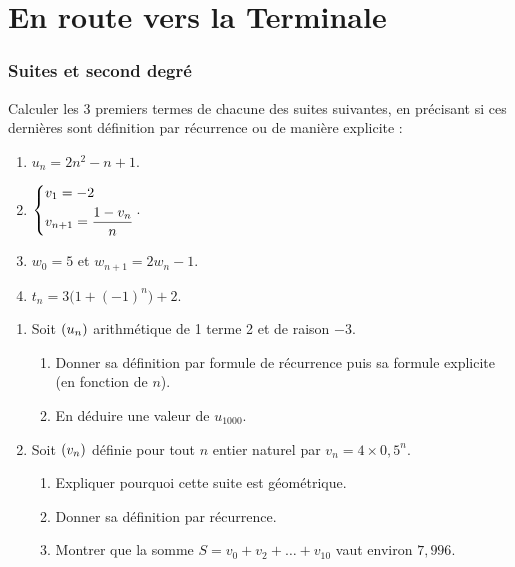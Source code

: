 \documentclass[a4paper,11pt]{article}
\author{Pierquet}
\title{\nomfichier}
\begin{document}

\pagestyle{fancy}

\part*{En route vers la Terminale}

\smallskip


\smallskip

\section{Suites et second degré}

\begin{cexercice}
Calculer les 3 premiers termes de chacune des suites suivantes, en précisant si ces dernières sont définition par récurrence ou de manière explicite :
%
\begin{enumerate}
	\item $u_n = 2n^2-n+1$.
	\item $\begin{dcases} v_1=-2 \\ v_{n+1}=\dfrac{1-v_n}{n} \end{dcases}$.
	\item $w_0=5$ et $w_{n+1}=2w_n-1$.
	\item $t_n=3\big(1+(-1)^n\big)+2$.
\end{enumerate}
\end{cexercice}

\begin{cexercice}
\vspace{-0.8\baselineskip}
\begin{enumerate}[leftmargin=*]
	\item Soit $\suiten$ arithmétique de 1 terme 2 et de raison $-3$.
	\begin{enumerate}
		\item Donner sa définition par formule de récurrence puis sa formule explicite (en fonction de $n$).
		\item En déduire une valeur de $u_{\num{1000}}$.
	\end{enumerate}
	\item Soit $\suiten[v]$ définie pour tout $n$ entier naturel par $v_n = 4 \times 0,5^n$.
	\begin{enumerate}
		\item Expliquer pourquoi cette suite est géométrique.
		\item Donner sa définition par récurrence.
		\item Montrer que la somme $S=v_0+v_2+\ldots+v_{10}$ vaut environ $7,996$.
	\end{enumerate}
\end{enumerate}
\end{cexercice}
\end{document}

